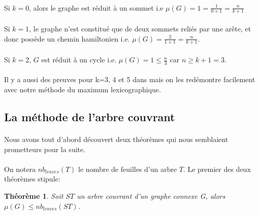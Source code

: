 \documentclass[a4paper]{article}
\newtheorem{theorem}{Théorème}
\theoremstyle{definition}
\theoremstyle{remark}
\begin{document}
\paragraph{}
Si $k=0$, alors le graphe est réduit à un sommet i.e $\mu(G)=1=\frac{1}{0+1}=\frac{n}{k+1}$


\paragraph{}
Si $k=1$, le graphe n'est constitué que de deux sommets reliés par une arête, et donc possède un chemin hamiltonien i.e. $\mu(G)=\frac{2}{1+1}=\frac{n}{k+1}$.


\paragraph{}
Si $k=2$, $G$ est réduit à un cycle i.e. $\mu(G)=1 \leq \frac{n}{3}$ car $n \geq k+1 = 3$.


\paragraph{}
Il y a aussi des preuves pour k=3, 4 et 5 dans \cite{MagnantMartin} mais on les redémontre facilement avec notre méthode du maximum lexicographique.

\subsection{La méthode de l'arbre couvrant}

\paragraph{}
Nous avons tout d'abord découvert deux théorèmes qui nous semblaient prometteurs pour la suite.

\paragraph{}
On notera $nb_{leaves}(T)$ le nombre de feuilles d'un arbre $T$. Le premier des deux théorèmes stipule:
\begin{theorem}
Soit $ST$ un arbre couvrant d'un graphe connexe G, alors $\mu(G) \leq nb_{leaves}(ST)$.
\end{theorem}
\end{document}

